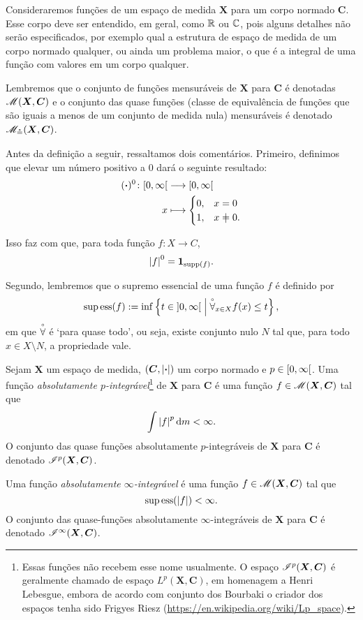 Consideraremos funções de um espaço de medida $\bm X$ para um corpo normado $\bm C$. Esse corpo deve ser entendido, em geral, como $\mathbb{R}$ ou $\mathbb{C}$, pois alguns detalhes não serão especificados, por exemplo qual a estrutura de espaço de medida de um corpo normado qualquer, ou ainda um problema maior, o que é a integral de uma função com valores em um corpo qualquer.

Lembremos que o conjunto de funções mensuráveis de $\bm X$ para $\bm C$ é denotadas $\mathscr{M}(\bm X,\bm C)$ e o conjunto das quase funções (classe de equivalência de funções que são iguais a menos de um conjunto de medida nula) mensuráveis é denotado $\mathscr{M}_{\circeq}(\bm X,\bm C)$.

Antes da definição a seguir, ressaltamos dois comentários. Primeiro, definimos que elevar um número positivo a $0$ dará o seguinte resultado:
	\begin{align*}
	\func{(\var)^0}{\intfa{0}{\infty}}{\intfa{0}{\infty}}{x}{
		\begin{cases}
			0,& x=0 \\
			1,& x \neq 0.
		\end{cases}
	}
	\end{align*}

Isso faz com que, para toda função $f\colon X \to C$,
	\begin{equation*}
	\left\vert{f}\right\vert^0 = {\bm 1}_{\operatorname{supp}(f)}.
	\end{equation*}

Segundo, lembremos que o supremo essencial de uma função $f$ é definido por
	\begin{equation*}
	\supess (f) := \inf \set{t \in \intaa{0}{\infty}}{\qforall_{x \in X} f(x) \leq t},
	\end{equation*}
em que $\qforall$ é `para quase todo', ou seja, existe conjunto nulo $N$ tal que, para todo $x \in X \setminus N$, a propriedade vale.

\begin{definition}
Sejam $\bm X$ um espaço de medida, $(\bm C,\left\vert{\bm{\cdot}}\right\vert)$ um corpo normado e $p \in \left[0,\allowbreak \infty\right[$. Uma função \emph{absolutamente $p$-integrável}\footnote{Essas funções não recebem esse nome usualmente. O espaço $\mathscr{I}^p(\bm X,\bm C)$ é geralmente chamado de espaço $L^p(\bm X,\bm C)$, em homenagem a Henri Lebesgue, embora de acordo com conjunto dos Bourbaki o criador dos espaços tenha sido Frigyes Riesz (\url{https://en.wikipedia.org/wiki/Lp_space}).} de $\bm X$ para $\bm C$ é uma função $f \in \mathscr{M}(\bm X,\bm C)$ tal que
	\begin{equation*}
	\int \left\vert{f}\right\vert^p \mathrm{d}m < \infty.
	\end{equation*}
O conjunto das quase funções absolutamente $p$-integráveis de $\bm X$ para $\bm C$ é denotado $\mathscr{I}^p(\bm X,\bm C)$.

Uma função \emph{absolutamente $\infty$-integrável} é uma função $f \in \mathscr{M}(\bm X,\bm C)$ tal que
	\begin{equation*}
	\operatorname{sup\,ess}(\left\vert{f}\right\vert) < \infty.
	\end{equation*}
O conjunto das quase-funções absolutamente $\infty$-integráveis de $\bm X$ para $\bm C$ é denotado $\mathscr{I}^\infty(\bm X,\bm C)$.
\end{definition}

